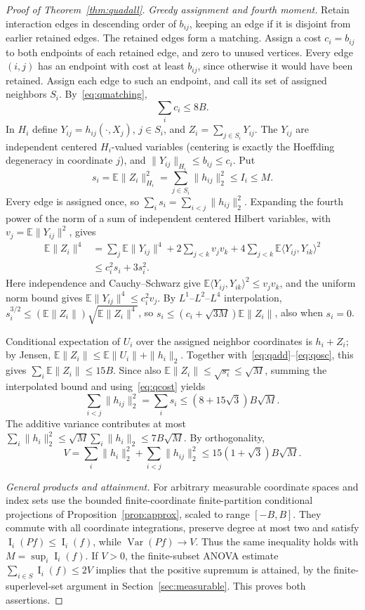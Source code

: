 \documentclass[11pt]{article}
\numberwithin{equation}{section}
\theoremstyle{remark}
\newcommand{\E}{\mathbb E}
\newcommand{\Var}{\operatorname{Var}}
\newcommand{\Inf}{\operatorname{I}}
\begin{document}
\begin{proof}[Proof of Theorem~\ref{thm:quadall}]
\emph{Greedy assignment and fourth moment.} Retain interaction edges in descending order of $b_{ij}$, keeping an edge if it is disjoint from earlier retained edges. The retained edges form a matching. Assign a cost $c_i=b_{ij}$ to both endpoints of each retained edge, and zero to unused vertices. Every edge $(i,j)$ has an endpoint with cost at least $b_{ij}$, since otherwise it would have been retained. Assign each edge to such an endpoint, and call its set of assigned neighbors $S_i$. By~\eqref{eq:qmatching},
\begin{equation}\label{eq:qcost}
 \sum_i c_i\le8B.
\end{equation}
In $H_i$ define $Y_{ij}=h_{ij}(\cdot,X_j)$, $j\in S_i$, and $Z_i=\sum_{j\in S_i}Y_{ij}$. The $Y_{ij}$ are independent centered $H_i$-valued variables (centering is exactly the Hoeffding degeneracy in coordinate $j$), and $\|Y_{ij}\|_{H_i}\le b_{ij}\le c_i$. Put
\[
 s_i=\E\|Z_i\|_{H_i}^2=\sum_{j\in S_i}\|h_{ij}\|_2^2\le I_i\le M.
\]
Every edge is assigned once, so $\sum_i s_i=\sum_{i<j}\|h_{ij}\|_2^2$. Expanding the fourth power of the norm of a sum of independent centered Hilbert variables, with $v_j=\E\|Y_{ij}\|^2$, gives
\begin{align*}
 \E\|Z_i\|^4&=\sum_j\E\|Y_{ij}\|^4
 +2\sum_{j<k}v_jv_k+4\sum_{j<k}\E\langle Y_{ij},Y_{ik}\rangle^2\\
 &\le c_i^2 s_i+3s_i^2.
\end{align*}
Here independence and Cauchy--Schwarz give $\E\langle Y_{ij},Y_{ik}\rangle^2\le v_jv_k$, and the uniform norm bound gives $\E\|Y_{ij}\|^4\le c_i^2v_j$. By $L^1$--$L^2$--$L^4$ interpolation,
$ s_i^{3/2}\le (\E\|Z_i\|)\sqrt{\E\|Z_i\|^4}$,
so $s_i\le (c_i+\sqrt{3M})\E\|Z_i\|$, also when $s_i=0$.

Conditional expectation of $U_i$ over the assigned neighbor coordinates is $h_i+Z_i$; by Jensen,
$\E\|Z_i\|\le\E\|U_i\|+\|h_i\|_2$.
Together with~\eqref{eq:qadd}--\eqref{eq:qosc}, this gives $\sum_i\E\|Z_i\|\le15B$. Since also $\E\|Z_i\|\le\sqrt{s_i}\le\sqrt M$, summing the interpolated bound and using~\eqref{eq:qcost} yields
\[
 \sum_{i<j}\|h_{ij}\|_2^2=\sum_i s_i
 \le(8+15\sqrt3)B\sqrt M.
\]
The additive variance contributes at most
$\sum_i\|h_i\|_2^2\le\sqrt M\sum_i\|h_i\|_2\le7B\sqrt M$.
By orthogonality,
\[
 V=\sum_i\|h_i\|_2^2+\sum_{i<j}\|h_{ij}\|_2^2
 \le15(1+\sqrt3)B\sqrt M.
\]

\emph{General products and attainment.} For arbitrary measurable coordinate spaces and index sets use the bounded finite-coordinate finite-partition conditional projections of Proposition~\ref{prop:approx}, scaled to range $[-B,B]$. They commute with all coordinate integrations, preserve degree at most two and satisfy $\Inf_i(Pf)\le\Inf_i(f)$, while $\Var(Pf)\to V$. Thus the same inequality holds with $M=\sup_i\Inf_i(f)$. If $V>0$, the finite-subset ANOVA estimate $\sum_{i\in S}\Inf_i(f)\le2V$ implies that the positive supremum is attained, by the finite-superlevel-set argument in Section~\ref{sec:measurable}. This proves both assertions.
\end{proof}
\end{document}
